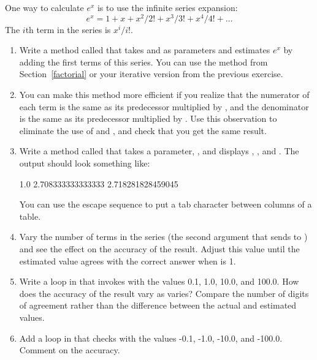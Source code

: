 \begin{exercise}

One way to calculate $e^x$ is to use the infinite series expansion:
%
\[ e^x = 1 + x + x^2 / 2! + x^3 / 3! + x^4 / 4! + \ldots \]
%
The $i$th term in the series is $x^i / i!$.

\begin{enumerate}

\item Write a method called  that takes  and  as parameters and estimates $e^x$ by adding the first  terms of this series.
You can use the  method from Section~\ref{factorial} or your iterative version from the previous exercise.


\item You can make this method more efficient if you realize that the numerator of each term is the same as its predecessor multiplied by , and the denominator is the same as its predecessor multiplied by .
Use this observation to eliminate the use of  and , and check that you get the same result.

\item Write a method called  that takes a parameter, , and displays , , and .
The output should look something like:

\begin{stdout}
1.0     2.708333333333333     2.718281828459045
\end{stdout}

You can use the escape sequence  to put a tab character between columns of a table.

\item Vary the number of terms in the series (the second argument that  sends to ) and see the effect on the accuracy of the result.
Adjust this value until the estimated value agrees with the correct answer when  is 1.

\item Write a loop in  that invokes  with the values 0.1, 1.0, 10.0, and 100.0.
How does the accuracy of the result vary as  varies?
Compare the number of digits of agreement rather than the difference between the actual and estimated values.

\item Add a loop in  that checks  with the values -0.1, -1.0, -10.0, and -100.0.
Comment on the accuracy.

\end{enumerate}

\end{exercise}


